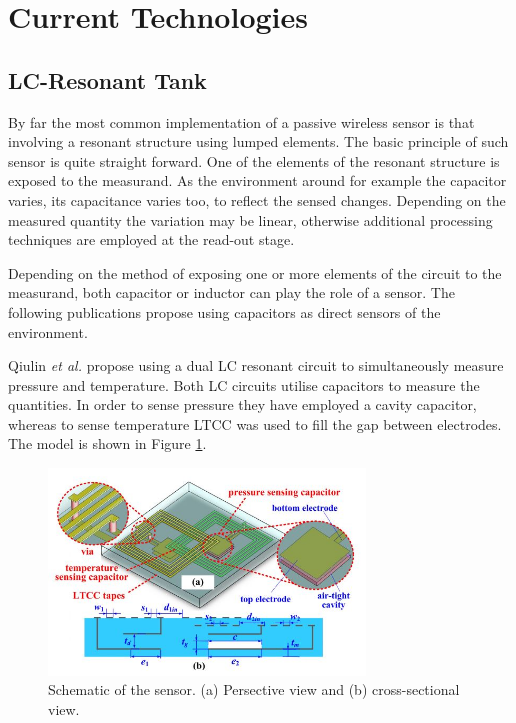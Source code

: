 \documentclass[11pt,a4paper]{article}
\begin{document}
\section{Current Technologies}

\subsection{LC-Resonant Tank}

By far the most common implementation of a passive wireless sensor is that involving a resonant structure using lumped elements. The basic principle of such sensor is quite straight forward. One of the elements of the resonant structure is exposed to the measurand. As the environment around for example the capacitor varies, its capacitance varies too, to reflect the sensed changes. Depending on the measured quantity the variation may be linear, otherwise additional processing techniques are employed at the read-out stage.

Depending on the method of exposing one or more elements of the circuit to the measurand, both capacitor or inductor can play the role of a sensor. The following publications propose using capacitors as direct sensors of the environment.

Qiulin \textit{et al.} \cite{harsh} propose using a dual LC resonant circuit to simultaneously measure pressure and temperature. Both LC circuits utilise capacitors to measure the quantities. In order to sense pressure they have employed a cavity capacitor, whereas to sense temperature LTCC \cite{LTCC} was used to fill the gap between electrodes. The model is shown in Figure \ref{fig:harsh1}.

\begin{figure}[h]
\centering
\includegraphics[width=0.75\textwidth]{harsh1.JPG}
\caption{Schematic of the sensor. (a) Persective view and (b) cross-sectional view. \cite{harsh}\label{fig:harsh1}}
\end{figure}
\end{document}
